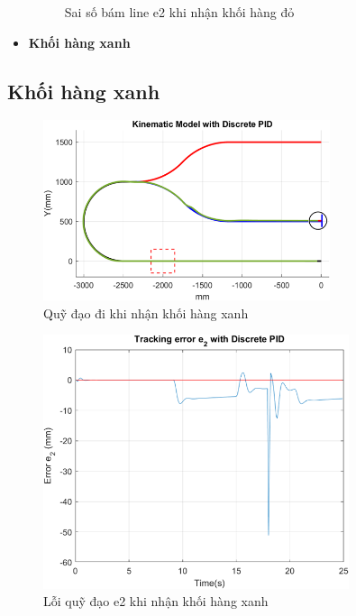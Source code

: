 \begin{itemize}
\begin{figure}[H]
                         \caption{Sai số bám line e2 khi nhận khối hàng đỏ}
                         \label{err_red}
                    \end{figure}
               \item \textbf{Khối hàng xanh}
          \end{itemize}
               
          \subsection{Khối hàng xanh}
               \begin{figure}[H]
                    \centering
                    \includegraphics[width=0.75\textwidth]{pictures/chapter8/trajec_blue.png}
                    \caption{Quỹ đạo đi khi nhận khối hàng xanh}
                    \label{tra_blue}
               \end{figure}
               \begin{figure}[H]
                    \centering
                    \includegraphics[width=0.8\textwidth]{pictures/chapter8/err_blue.png}
                    \caption{Lỗi quỹ đạo e2 khi nhận khối hàng xanh}
                    \label{err_blue}
               \end{figure}
